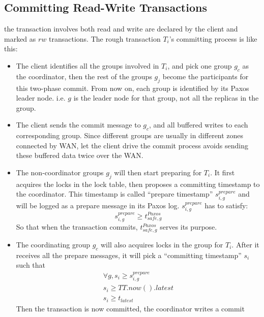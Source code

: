 \subsection{Committing Read-Write Transactions}
the transaction involves both read and write are declared by the client and
marked as $rw$ transactions. The rough transaction $T_i$'s committing process
is like this:
\begin{itemize}
   \item The client identifies all the groups involved in $T_i$, and pick one
      group $g_{c}$ as the coordinator, then the rest of the groups $g_{j}$
      become the participants for this two-phase commit. From now on, each
      group is identified by its Paxos leader node. i.e. $g$ is the leader node
      for that group, not all the replicas in the group.
   \item The client sends the commit message to $g_{c}$, and all buffered
      writes to each corresponding group. Since different groups are usually in
      different zones connected by WAN, let the client drive the commit process
      avoids sending these buffered data twice over the WAN.
   \item The non-coordinator groups $g_{j}$ will then start preparing for $T_i$.
      It first acquires the locks in the lock table, then proposes a committing
      timestamp to the coordinator. This timestamp is called ``prepare timestamp''
      $s_{i, g}^{prepare}$
      and will be logged as a prepare message in its Paxos log. $s_{i, g}^{prepare}$
      has to satisfy:
      \begin{equation}
         s_{i, g}^{prepare} \ge t_{safe, g}^{Paxos}
      \end{equation}
      So that when the transaction commits, $t_{safe, g}^{Paxos}$ serves its
      purpose.
   \item The coordinating group $g_c$ will also acquires locks in the group
      for $T_i$. After it receives all the prepare messages, it will pick
      a ``committing timestamp'' $s_i$ such that
      \begin{equation}
         \begin{split}
         \forall g, s_i \ge s_{i, g}^{prepare} \\
         s_i \ge TT.now().latest \\
         s_i \ge t_{latest}
         \end{split}
      \end{equation}
      Then the transaction is now committed, the coordinator writes a commit

\end{itemize}
